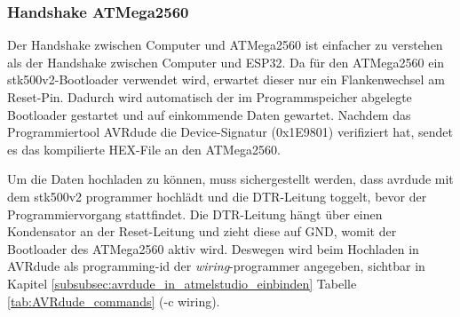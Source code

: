 


%
\subsubsection{Handshake ATMega2560}\label{subsubsec:Handshake_ATMega2560}

Der Handshake zwischen Computer und ATMega2560 ist einfacher zu verstehen als der Handshake zwischen Computer und ESP32. Da für den ATMega2560 ein stk500v2-Bootloader verwendet wird, erwartet dieser nur ein Flankenwechsel am Reset-Pin. Dadurch wird automatisch der im Programmspeicher abgelegte Bootloader gestartet und auf einkommende Daten gewartet. Nachdem das Programmiertool AVRdude die Device-Signatur (0x1E9801) verifiziert hat, sendet es das kompilierte HEX-File an den ATMega2560.

Um die Daten hochladen zu können, muss sichergestellt werden, dass avrdude mit dem stk500v2 programmer hochlädt und die DTR-Leitung toggelt, bevor der Programmiervorgang stattfindet. Die DTR-Leitung hängt über einen Kondensator an der Reset-Leitung und zieht diese auf GND, womit der Bootloader des ATMega2560 aktiv wird. Deswegen wird beim Hochladen in AVRdude als programming-id der \textit{wiring}-programmer angegeben, sichtbar in Kapitel \ref{subsubsec:avrdude_in_atmelstudio_einbinden} Tabelle \ref{tab:AVRdude_commands} (-c wiring).

\newpage

